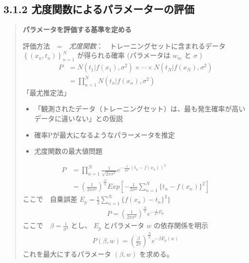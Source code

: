 \documentclass[letterpaper,10pt,dvipdfmx]{sphinxmanual}
\begin{document}
\subsection{3.1.2 尤度関数によるパラメーターの評価}
\label{Chapter_3_MLE:id3}\begin{quote}

\textbf{パラメータを評価する基準を定める}

評価方法　=　\emph{尤度関数}：　トレーニングセットに含まれるデータ \(\left \{(x_n,t_n) \right \}^N_{n=1}\) が得られる確率 (パラメータは \(w_m\) と \(\sigma\) )
\begin{equation*}
\begin{split}P &= N(t_1| f(x_1),\sigma^2) \times \cdots \times N(t_N| f(x_N),\sigma^2) \\
  &= \prod_{n=1}^{N} N(t_n| f(x_n),\sigma^2)\end{split}
\end{equation*}
「最尤推定法」
\begin{itemize}
\item {} 
「観測されたデータ（トレーニングセット）は、最も発生確率が高いデータに違いない」との仮説

\item {} 
確率Pが最大になるようなパラーメータを推定

\item {} 
尤度関数の最大値問題

\end{itemize}
\begin{equation*}
\begin{split}P &= \prod_{n=1}^{N} \frac{1}{\sqrt{2 \pi \sigma^2}} e^{- \frac{1}{2 \sigma^2}(t_n - f(x_n))^2} \\
  &= \left (\frac{1}{2 \pi \sigma^2} \right )^{\frac{N}{2}} Exp \left [- \frac{1}{2 \sigma^2} \sum_{n=1}^{N} \{t_n - f(x_n)\}^2 \right ]\end{split}
\end{equation*}
ここで　自乗誤差 \(E_p = \frac{1}{2} \sum_{n=1}^{N} \{ f(x_n) - t_n\}^2 \}\)
\begin{equation*}
\begin{split}P = (\frac{1}{2 \pi \sigma^2})^{\frac{N}{2}} e^{- \frac{1}{\sigma^2} E_p}\end{split}
\end{equation*}
ここで　\(\beta = \frac{1}{\sigma^2}\) とし、 \(E_p\) とパラメータ \(w\) の依存関係を明示
\begin{equation*}
\begin{split}P(\beta,w) = (\frac{\beta}{2 \pi})^{\frac{N}{2}} e^{- \beta E_p(w)}\end{split}
\end{equation*}
これを最大にするパラメータ \((\beta,w)\) を求める。


\end{quote}
\end{document}

